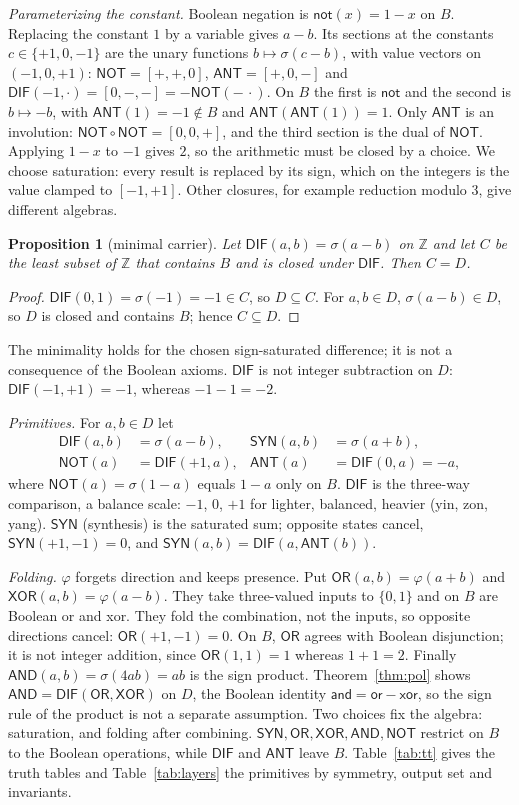 \documentclass[conference]{IEEEtran}
\newcommand{\D}{D}
\newcommand{\sgn}{\sigma}
\newcommand{\fold}{\varphi}
\newcommand{\SYN}{\mathsf{SYN}}
\newcommand{\DIF}{\mathsf{DIF}}
\newcommand{\OR}{\mathsf{OR}}
\newcommand{\XOR}{\mathsf{XOR}}
\newcommand{\AND}{\mathsf{AND}}
\newcommand{\NOT}{\mathsf{NOT}}
\newcommand{\ANT}{\mathsf{ANT}}
\newtheorem{proposition}{Proposition}
\theoremstyle{remark}
\begin{document}
	\emph{Parameterizing the constant.} Boolean negation is $\mathsf{not}(x)=1-x$ on $B$. Replacing the constant $1$ by a variable gives $a-b$. Its sections at the constants $c\in\{+1,0,-1\}$ are the unary functions $b\mapsto\sgn(c-b)$, with value vectors on $(-1,0,+1)$: $\NOT=[+,+,0]$, $\ANT=[+,0,-]$ and $\DIF(-1,\cdot)=[0,-,-]=-\NOT(-\,\cdot)$. On $B$ the first is $\mathsf{not}$ and the second is $b\mapsto-b$, with $\ANT(1)=-1\notin B$ and $\ANT(\ANT(1))=1$. Only $\ANT$ is an involution: $\NOT\circ\NOT=[0,0,+]$, and the third section is the dual of $\NOT$. Applying $1-x$ to $-1$ gives $2$, so the arithmetic must be closed by a choice. We choose saturation: every result is replaced by its sign, which on the integers is the value clamped to $[-1,+1]$. Other closures, for example reduction modulo $3$, give different algebras.
	
	\begin{proposition}[minimal carrier]\label{prop:carrier}
		Let $\DIF(a,b)=\sgn(a-b)$ on $\mathbb Z$ and let $C$ be the least subset of $\mathbb Z$ that contains $B$ and is closed under $\DIF$. Then $C=\D$.
	\end{proposition}
	\begin{proof}
		$\DIF(0,1)=\sgn(-1)=-1\in C$, so $\D\subseteq C$. For $a,b\in\D$, $\sgn(a-b)\in\D$, so $\D$ is closed and contains $B$; hence $C\subseteq\D$.
	\end{proof}
	The minimality holds for the chosen sign-saturated difference; it is not a consequence of the Boolean axioms. $\DIF$ is not integer subtraction on $\D$: $\DIF(-1,+1)=-1$, whereas $-1-1=-2$.
	
	\emph{Primitives.} For $a,b\in\D$ let
	\begin{align*}
		\DIF(a,b)&=\sgn(a-b), & \SYN(a,b)&=\sgn(a+b),\\
		\NOT(a)&=\DIF(+1,a), & \ANT(a)&=\DIF(0,a)=-a,
	\end{align*}
	where $\NOT(a)=\sgn(1-a)$ equals $1-a$ only on $B$. $\DIF$ is the three-way comparison, a balance scale: $-1$, $0$, $+1$ for lighter, balanced, heavier (yin, zon, yang). $\SYN$ (synthesis) is the saturated sum; opposite states cancel, $\SYN(+1,-1)=0$, and $\SYN(a,b)=\DIF(a,\ANT(b))$.
	
	\emph{Folding.} $\fold$ forgets direction and keeps presence. Put $\OR(a,b)=\fold(a+b)$ and $\XOR(a,b)=\fold(a-b)$. They take three-valued inputs to $\{0,1\}$ and on $B$ are Boolean or and xor. They fold the combination, not the inputs, so opposite directions cancel: $\OR(+1,-1)=0$. On $B$, $\OR$ agrees with Boolean disjunction; it is not integer addition, since $\OR(1,1)=1$ whereas $1+1=2$. Finally $\AND(a,b)=\sgn(4ab)=ab$ is the sign product. Theorem~\ref{thm:pol} shows $\AND=\DIF(\OR,\XOR)$ on $\D$, the Boolean identity $\mathsf{and}=\mathsf{or}-\mathsf{xor}$, so the sign rule of the product is not a separate assumption. Two choices fix the algebra: saturation, and folding after combining. $\SYN,\OR,\XOR,\AND,\NOT$ restrict on $B$ to the Boolean operations, while $\DIF$ and $\ANT$ leave $B$. Table~\ref{tab:tt} gives the truth tables and Table~\ref{tab:layers} the primitives by symmetry, output set and invariants.
	
\end{document}
